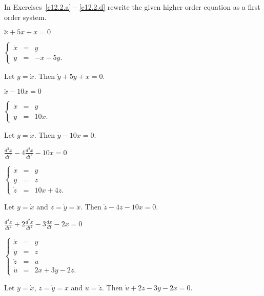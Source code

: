 \documentclass{ximera}
\begin{document}
\TEXER


\noindent In Exercises~\ref{c12.2.a} -- \ref{c12.2.d} rewrite the given
higher order equation as a first order system.
\begin{exercise} \label{c12.2.a}
$\ddot{x}+5\dot{x}+x = 0$

\begin{solution}
\ans $\left\{\begin{array}{rcl} \dot{x} & = & y \\
\dot{y} & = & -x-5y. \end{array}\right.$

\soln  Let $y = \dot{x}$.  Then $\dot{y}+5y+x=0$.


\end{solution}
\end{exercise}
\begin{exercise} \label{c12.2.b}
$\ddot{x}-10x = 0$

\begin{solution}
\ans $\left\{\begin{array}{rcl} \dot{x} & = & y \\
\dot{y} & = & 10x. \end{array}\right.$

\soln  Let $y = \dot{x}$.  Then $\dot{y}-10x=0$.


\end{solution}
\end{exercise}
\begin{exercise} \label{c12.2.c}
$\frac{d^3x}{dt^3}-4\frac{d^2x}{dt^2}-10x = 0$

\begin{solution}
\ans $\left\{\begin{array}{rcl} \dot{x} & = & y \\
\dot{y} & = & z\\
\dot{z} & = & 10x+4z. \end{array}\right.$

\soln  Let $y = \dot{x}$ and $z=\dot{y}=\ddot{x}$.  Then 
$\dot{z}-4z-10x=0$.


\end{solution}
\end{exercise}
\begin{exercise} \label{c12.2.d}
$\frac{d^4x}{dt^4}+2\frac{d^2x}{dt^2}-3\frac{dx}{dt}-2x = 0$

\begin{solution}
\ans $\left\{\begin{array}{rcl} \dot{x} & = & y \\
\dot{y} & = & z\\
\dot{z} & = & u\\
\dot{u} & = & 2x+3y-2z. \end{array}\right.$

\soln  Let $y = \dot{x}$, $z=\dot{y}=\ddot{x}$ and $u=\dot{z}$.  Then 
$\dot{u}+2z-3y-2x=0$.

\end{solution}
\end{exercise}
\end{document}
